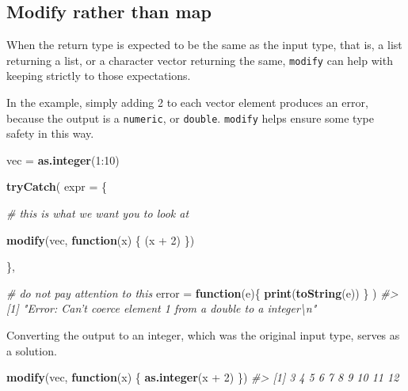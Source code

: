 \documentclass[]{book}
\newenvironment{Shaded}{}{}
\newcommand{\CommentTok}[1]{\textcolor[rgb]{0.38,0.63,0.69}{\textit{#1}}}
\newcommand{\ControlFlowTok}[1]{\textcolor[rgb]{0.00,0.44,0.13}{\textbf{#1}}}
\newcommand{\DataTypeTok}[1]{\textcolor[rgb]{0.56,0.13,0.00}{#1}}
\newcommand{\DecValTok}[1]{\textcolor[rgb]{0.25,0.63,0.44}{#1}}
\newcommand{\KeywordTok}[1]{\textcolor[rgb]{0.00,0.44,0.13}{\textbf{#1}}}
\newcommand{\NormalTok}[1]{#1}
\newcommand{\OperatorTok}[1]{\textcolor[rgb]{0.40,0.40,0.40}{#1}}
\newcommand{\StringTok}[1]{\textcolor[rgb]{0.25,0.44,0.63}{#1}}
\begin{document}
\hypertarget{modify-rather-than-map}{%
\subsection{Modify rather than map}\label{modify-rather-than-map}}

When the return type is expected to be the same as the input type, that is, a list returning a list, or a character vector returning the same, \texttt{modify} can help with keeping strictly to those expectations.

In the example, simply adding 2 to each vector element produces an error, because the output is a \texttt{numeric}, or \texttt{double}. \texttt{modify} helps ensure some type safety in this way.

\begin{Shaded}
\begin{Highlighting}[]
\NormalTok{vec =}\StringTok{ }\KeywordTok{as.integer}\NormalTok{(}\DecValTok{1}\OperatorTok{:}\DecValTok{10}\NormalTok{)}

\KeywordTok{tryCatch}\NormalTok{(}
  \DataTypeTok{expr =}\NormalTok{ \{}
    
    \CommentTok{# this is what we want you to look at}
    
    \KeywordTok{modify}\NormalTok{(vec, }\ControlFlowTok{function}\NormalTok{(x) \{ (x }\OperatorTok{+}\StringTok{ }\DecValTok{2}\NormalTok{) \})}
    
\NormalTok{  \},}
  
  \CommentTok{# do not pay attention to this}
  \DataTypeTok{error =} \ControlFlowTok{function}\NormalTok{(e)\{}
    \KeywordTok{print}\NormalTok{(}\KeywordTok{toString}\NormalTok{(e))}
\NormalTok{  \}}
\NormalTok{)}
\CommentTok{#> [1] "Error: Can't coerce element 1 from a double to a integer\textbackslash{}n"}
\end{Highlighting}
\end{Shaded}

Converting the output to an integer, which was the original input type, serves as a solution.

\begin{Shaded}
\begin{Highlighting}[]
\KeywordTok{modify}\NormalTok{(vec, }\ControlFlowTok{function}\NormalTok{(x) \{ }\KeywordTok{as.integer}\NormalTok{(x }\OperatorTok{+}\StringTok{ }\DecValTok{2}\NormalTok{) \})}
\CommentTok{#>  [1]  3  4  5  6  7  8  9 10 11 12}
\end{Highlighting}
\end{Shaded}
\end{document}
